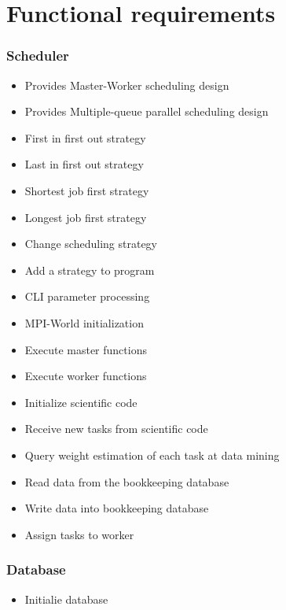 {


\setcounter{func}{10}
\renewcommand{\labelitemi}{
	\ifnum \value{func}<10$/F 0\arabic{func} /$\addtocounter{func}{10}
	\else $/F \arabic{func} /$\addtocounter{func}{10}\fi
	}

\section{Functional requirements} 
	
	\subsubsection{Scheduler}
	
		\begin{itemize}
			\item Provides Master-Worker scheduling design 
			\item Provides Multiple-queue parallel scheduling design
			\item First in first out strategy
			\item Last in first out strategy
			\item Shortest job first strategy
			\item Longest job first strategy 
			\item Change scheduling strategy
			\item Add a strategy to program
			\item CLI parameter processing
			\item MPI-World initialization
			\item Execute master functions
			\item Execute worker functions
			\item Initialize scientific code 
			\item Receive new tasks from scientific code
			\item Query weight estimation of each task at data mining
			\item Read data from the bookkeeping database
			\item Write data into bookkeeping database
			\item Assign tasks to worker
		\end{itemize}
	
	\subsubsection{Database}
	
		\begin{itemize}
			\item Initialie database
		\end{itemize}
		
}
